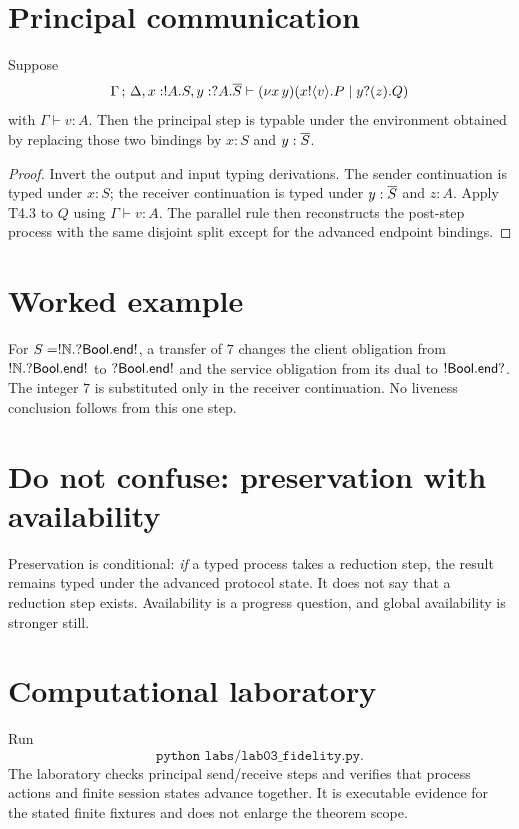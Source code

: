 \section{Principal communication}
\begin{proposition}
Suppose
\[
\Gamma\,;\,\Delta,x:!A.S,y:?A.\overline{S} \vdash (\nu x\,y)(x!\langle v\rangle.P\mid y?(z).Q)
\]
with $\Gamma\vdash v:A$. Then the principal step is typable under the environment obtained by replacing those two bindings by $x:S$ and $y:\overline{S}$.
\end{proposition}
\begin{proof}
Invert the output and input typing derivations. The sender continuation is typed under $x:S$; the receiver continuation is typed under $y:\overline{S}$ and $z:A$. Apply T4.3 to $Q$ using $\Gamma\vdash v:A$. The parallel rule then reconstructs the post-step process with the same disjoint split except for the advanced endpoint bindings.
\end{proof}



\section{Worked example}
\begin{workedexample}
For $S=!\mathbb{N}.?\mathsf{Bool}.\mathsf{end!}$, a transfer of $7$ changes the client obligation from $!\mathbb{N}.? \mathsf{Bool}.\mathsf{end!}$ to $?\mathsf{Bool}.\mathsf{end!}$ and the service obligation from its dual to $!\mathsf{Bool}.\mathsf{end?}$. The integer $7$ is substituted only in the receiver continuation. No liveness conclusion follows from this one step.
\end{workedexample}

\section{Do not confuse: preservation with availability}
\begin{warningbox}
Preservation is conditional: \emph{if} a typed process takes a reduction step, the result remains typed under the advanced protocol state. It does not say that a reduction step exists. Availability is a progress question, and global availability is stronger still.
\end{warningbox}



\section{Computational laboratory}
\begin{labbox}
Run
\[
  \texttt{python labs/lab03_fidelity.py}.
\]
The laboratory checks principal send/receive steps and verifies that process actions and finite session states advance together. It is executable evidence for the stated finite fixtures and does not enlarge the theorem scope.
\end{labbox}

